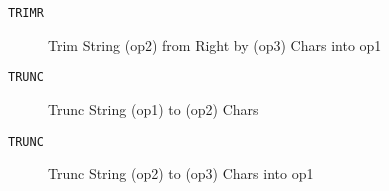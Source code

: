 
\begin{description}
\item[\texttt{TRIMR      }]  Trim String (op2) from Right by (op3) Chars into op1\\
\end{description}

\begin{description}
\item[\texttt{TRUNC      }]  Trunc String (op1) to (op2) Chars\\
\end{description}

\begin{description}
\item[\texttt{TRUNC      }]  Trunc String (op2) to (op3) Chars into op1\\
\end{description}

